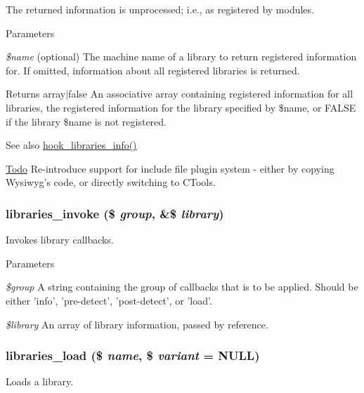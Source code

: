 The returned information is unprocessed; i.e., as registered by modules.


\begin{DoxyParams}{Parameters}
\item[{\em \$name}](optional) The machine name of a library to return registered information for. If omitted, information about all registered libraries is returned.\end{DoxyParams}
\begin{DoxyReturn}{Returns}
array$|$false An associative array containing registered information for all libraries, the registered information for the library specified by \$name, or FALSE if the library \$name is not registered.
\end{DoxyReturn}
\begin{DoxySeeAlso}{See also}
\hyperlink{libraries_8api_8php_abe57a1a01f1d2d134a9014258fe9e016}{hook\_\-libraries\_\-info()}
\end{DoxySeeAlso}
\begin{Desc}
\item[\hyperlink{todo__todo000066}{Todo}]Re-\/introduce support for include file plugin system -\/ either by copying Wysiwyg's code, or directly switching to CTools. \end{Desc}
\hypertarget{libraries_8module_a3ac265c084e45903a8b9c4677d534f5b}{
\subsubsection[{libraries\_\-invoke}]{\setlength{\rightskip}{0pt plus 5cm}libraries\_\-invoke (\$ {\em group}, \/  \&\$ {\em library})}}
\label{libraries_8module_a3ac265c084e45903a8b9c4677d534f5b}
Invokes library callbacks.


\begin{DoxyParams}{Parameters}
\item[{\em \$group}]A string containing the group of callbacks that is to be applied. Should be either 'info', 'pre-\/detect', 'post-\/detect', or 'load'. \item[{\em \$library}]An array of library information, passed by reference. \end{DoxyParams}
\hypertarget{libraries_8module_a015c6cdcfc3a14262a48dcfe344a70de}{
\subsubsection[{libraries\_\-load}]{\setlength{\rightskip}{0pt plus 5cm}libraries\_\-load (\$ {\em name}, \/  \$ {\em variant} = {\ttfamily NULL})}}
\label{libraries_8module_a015c6cdcfc3a14262a48dcfe344a70de}
Loads a library.


